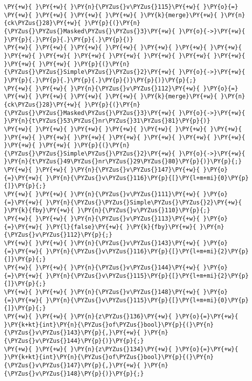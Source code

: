 \begin{Verbatim}[commandchars=\\\{\}]
\PY{+w}{ }\PY{+w}{ }\PY{n}{\PYZus{}v\PYZus{}115}\PY{+w}{ }\PY{o}{=}
\PY{+w}{ }\PY{+w}{ }\PY{+w}{ }\PY{+w}{ }\PY{k}{merge}\PY{+w}{ }\PY{n}{ck\PYZus{}28}\PY{+w}{ }\PY{p}{(}\PY{n}{\PYZus{}\PYZus{}Masked\PYZus{}\PYZus{}3}\PY{+w}{ }\PY{o}{->}\PY{+w}{ }\PY{p}{.}\PY{p}{.}\PY{p}{.}\PY{p}{)}
\PY{+w}{ }\PY{+w}{ }\PY{+w}{ }\PY{+w}{ }\PY{+w}{ }\PY{+w}{ }\PY{+w}{ }\PY{+w}{ }\PY{+w}{ }\PY{+w}{ }\PY{+w}{ }\PY{+w}{ }\PY{+w}{ }\PY{+w}{ }\PY{+w}{ }\PY{+w}{ }\PY{p}{(}\PY{n}{\PYZus{}\PYZus{}Simple\PYZus{}\PYZus{}2}\PY{+w}{ }\PY{o}{->}\PY{+w}{ }\PY{p}{.}\PY{p}{.}\PY{p}{.}\PY{p}{)}\PY{p}{)}\PY{p}{;}
\PY{+w}{ }\PY{+w}{ }\PY{n}{\PYZus{}v\PYZus{}112}\PY{+w}{ }\PY{o}{=}
\PY{+w}{ }\PY{+w}{ }\PY{+w}{ }\PY{+w}{ }\PY{k}{merge}\PY{+w}{ }\PY{n}{ck\PYZus{}28}\PY{+w}{ }\PY{p}{(}\PY{n}{\PYZus{}\PYZus{}Masked\PYZus{}\PYZus{}3}\PY{+w}{ }\PY{o}{->}\PY{+w}{ }\PY{n}{t\PYZus{}53\PYZus{}nr\PYZus{}31\PYZus{}81}\PY{p}{)}
\PY{+w}{ }\PY{+w}{ }\PY{+w}{ }\PY{+w}{ }\PY{+w}{ }\PY{+w}{ }\PY{+w}{ }\PY{+w}{ }\PY{+w}{ }\PY{+w}{ }\PY{+w}{ }\PY{+w}{ }\PY{+w}{ }\PY{+w}{ }\PY{+w}{ }\PY{+w}{ }\PY{p}{(}\PY{n}{\PYZus{}\PYZus{}Simple\PYZus{}\PYZus{}2}\PY{+w}{ }\PY{o}{->}\PY{+w}{ }\PY{n}{t\PYZus{}49\PYZus{}nr\PYZus{}29\PYZus{}80}\PY{p}{)}\PY{p}{;}
\PY{+w}{ }\PY{+w}{ }\PY{n}{\PYZus{}v\PYZus{}147}\PY{+w}{ }\PY{o}{=}\PY{+w}{ }\PY{n}{\PYZus{}v\PYZus{}116}\PY{p}{[}\PY{l+m+mi}{0}\PY{p}{]}\PY{p}{;}
\PY{+w}{ }\PY{+w}{ }\PY{n}{\PYZus{}v\PYZus{}111}\PY{+w}{ }\PY{o}{=}\PY{+w}{ }\PY{n}{\PYZus{}\PYZus{}Simple\PYZus{}\PYZus{}2}\PY{+w}{ }\PY{k}{fby}\PY{+w}{ }\PY{n}{\PYZus{}v\PYZus{}110}\PY{p}{;}
\PY{+w}{ }\PY{+w}{ }\PY{n}{\PYZus{}v\PYZus{}113}\PY{+w}{ }\PY{o}{=}\PY{+w}{ }\PY{l}{false}\PY{+w}{ }\PY{k}{fby}\PY{+w}{ }\PY{n}{\PYZus{}v\PYZus{}112}\PY{p}{;}
\PY{+w}{ }\PY{+w}{ }\PY{n}{\PYZus{}v\PYZus{}143}\PY{+w}{ }\PY{o}{=}\PY{+w}{ }\PY{n}{\PYZus{}v\PYZus{}116}\PY{p}{[}\PY{l+m+mi}{2}\PY{p}{]}\PY{p}{;}
\PY{+w}{ }\PY{+w}{ }\PY{n}{\PYZus{}v\PYZus{}144}\PY{+w}{ }\PY{o}{=}\PY{+w}{ }\PY{n}{\PYZus{}v\PYZus{}115}\PY{p}{[}\PY{l+m+mi}{2}\PY{p}{]}\PY{p}{;}
\PY{+w}{ }\PY{+w}{ }\PY{n}{\PYZus{}v\PYZus{}148}\PY{+w}{ }\PY{o}{=}\PY{+w}{ }\PY{n}{\PYZus{}v\PYZus{}115}\PY{p}{[}\PY{l+m+mi}{0}\PY{p}{]}\PY{p}{;}
\PY{+w}{ }\PY{+w}{ }\PY{n}{z\PYZus{}136}\PY{+w}{ }\PY{o}{=}\PY{+w}{ }\PY{k+kt}{int}\PY{n}{\PYZus{}of\PYZus{}bool}\PY{p}{(}\PY{n}{\PYZus{}v\PYZus{}143}\PY{p}{,}\PY{+w}{ }\PY{n}{\PYZus{}v\PYZus{}144}\PY{p}{)}\PY{p}{;}
\PY{+w}{ }\PY{+w}{ }\PY{n}{z\PYZus{}134}\PY{+w}{ }\PY{o}{=}\PY{+w}{ }\PY{k+kt}{int}\PY{n}{\PYZus{}of\PYZus{}bool}\PY{p}{(}\PY{n}{\PYZus{}v\PYZus{}147}\PY{p}{,}\PY{+w}{ }\PY{n}{\PYZus{}v\PYZus{}148}\PY{p}{)}\PY{p}{;}

\end{Verbatim}

